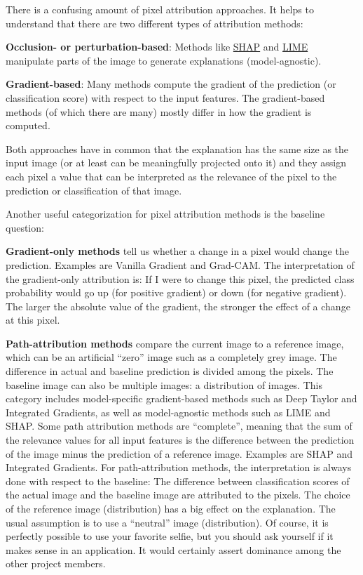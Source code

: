 \documentclass[12pt,]{krantz}
\begin{document}
There is a confusing amount of pixel attribution approaches. It helps to
understand that there are two different types of attribution methods:

\textbf{Occlusion- or perturbation-based}: Methods like
\protect\hyperlink{shapux5cux257D}{SHAP} and
\protect\hyperlink{lime}{LIME} manipulate parts of the image to generate
explanations (model-agnostic).

\textbf{Gradient-based}: Many methods compute the gradient of the
prediction (or classification score) with respect to the input features.
The gradient-based methods (of which there are many) mostly differ in
how the gradient is computed.

Both approaches have in common that the explanation has the same size as
the input image (or at least can be meaningfully projected onto it) and
they assign each pixel a value that can be interpreted as the relevance
of the pixel to the prediction or classification of that image.

Another useful categorization for pixel attribution methods is the
baseline question:

\textbf{Gradient-only methods} tell us whether a change in a pixel would
change the prediction. Examples are Vanilla Gradient and Grad-CAM. The
interpretation of the gradient-only attribution is: If I were to change
this pixel, the predicted class probability would go up (for positive
gradient) or down (for negative gradient). The larger the absolute value
of the gradient, the stronger the effect of a change at this pixel.

\textbf{Path-attribution methods} compare the current image to a
reference image, which can be an artificial ``zero'' image such as a
completely grey image. The difference in actual and baseline prediction
is divided among the pixels. The baseline image can also be multiple
images: a distribution of images. This category includes model-specific
gradient-based methods such as Deep Taylor and Integrated Gradients, as
well as model-agnostic methods such as LIME and SHAP. Some path
attribution methods are ``complete'', meaning that the sum of the
relevance values for all input features is the difference between the
prediction of the image minus the prediction of a reference image.
Examples are SHAP and Integrated Gradients. For path-attribution
methods, the interpretation is always done with respect to the baseline:
The difference between classification scores of the actual image and the
baseline image are attributed to the pixels. The choice of the reference
image (distribution) has a big effect on the explanation. The usual
assumption is to use a ``neutral'' image (distribution). Of course, it
is perfectly possible to use your favorite selfie, but you should ask
yourself if it makes sense in an application. It would certainly assert
dominance among the other project members.
\end{document}
